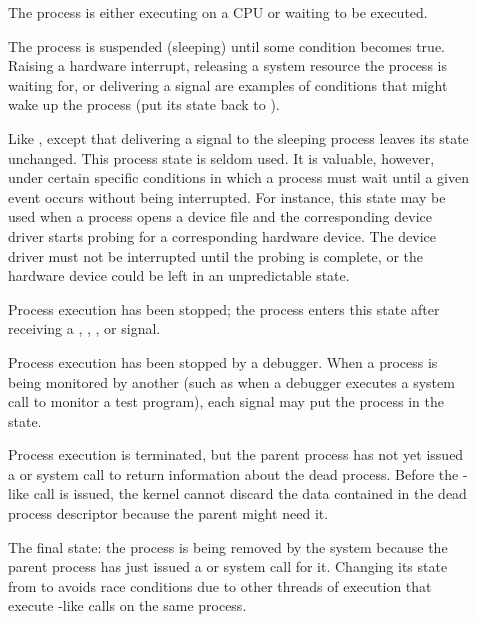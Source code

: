 \begin{description}
\item[] The process is either executing on a CPU or waiting to be
  executed.
\item[] The process is suspended (sleeping) until some condition
  becomes true. Raising a hardware interrupt, releasing a system resource the process is
  waiting for, or delivering a signal are examples of conditions that might wake up the
  process (put its state back to ).
\item[] Like , except that
  delivering a signal to the sleeping process leaves its state unchanged. This process
  state is seldom used. It is valuable, however, under certain specific conditions in
  which a process must wait until a given event occurs without being interrupted. For
  instance, this state may be used when a process opens a device file and the
  corresponding device driver starts probing for a corresponding hardware device. The
  device driver must not be interrupted until the probing is complete, or the hardware
  device could be left in an unpredictable state.
\item[] Process execution has been stopped; the process enters this
  state after receiving a , , , or
   signal.
\item[] Process execution has been stopped by a debugger. When a
  process is being monitored by another (such as when a debugger executes a
   system call to monitor a test program), each signal may put the process
  in the  state.
\item[] Process execution is terminated, but the parent process has not
  yet issued a  or  system call to return information about
  the dead process. Before the -like call is issued, the kernel cannot
  discard the data contained in the dead process descriptor because the parent might need
  it.
\item[] The final state: the process is being removed by the system
  because the parent process has just issued a  or  system
  call for it. Changing its state from  to  avoids
  race conditions due to other threads of execution that execute -like calls
  on the same process.
\end{description}


